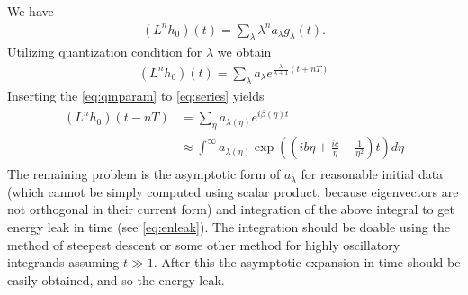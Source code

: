 \documentclass[
a4paper,%
10pt,%
titlepage,%
twoside%
]{article}
\begin{document}
We have
\begin{gather}
  (L^n h_0)(t)=\sum_\lambda \lambda^n a_\lambda g_\lambda(t).
\end{gather}
Utilizing quantization condition for $\lambda$ we obtain
\begin{gather}\label{eq:series}
  (L^n h_0)(t) =\sum_\lambda a_\lambda e^{\frac{\lambda}{\lambda+1}(t+nT)}
\end{gather}
Inserting the \eqref{eq:qmparam} to \eqref{eq:series} yields
\begin{gather}
  \begin{split}
    (L^n h_0)(t-nT) &=\sum_\eta a_{\lambda(\eta)} e^{i\beta(\eta)t}\\
    &\approx \int^\infty a_{\lambda(\eta)}\exp((ib\eta+\frac{ic}{\eta}-\frac{1}{\eta^2})t)d\eta
  \end{split}
\end{gather}
The remaining problem is the asymptotic form of $a_{\lambda}$ for
reasonable initial data (which cannot be simply computed using scalar
product, because eigenvectors are not orthogonal in their current
form) and integration of the above integral to get energy leak in time
(see \eqref{eq:enleak}). The integration should be doable using the
method of steepest descent or some other method for highly oscillatory
integrands assuming $t\gg 1$. After this the asymptotic expansion in
time should be easily obtained, and so the energy leak.



\end{document}
